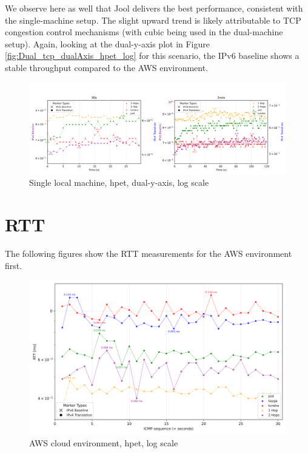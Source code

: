 We observe here as well that Jool delivers the best performance, consistent with the single-machine setup. 
The slight upward trend is likely attributable to TCP congestion control mechanisms (with cubic being used in the dual-machine setup).
Again, looking at the dual-y-axis plot in Figure \ref{fig:Dual_tcp_dualAxis_hpet_log} for this scenario, 
the IPv6 baseline shows a stable throughput compared to the AWS environment.
\begin{figure}[H]
    \centering
    \includegraphics[width=1\textwidth]{resources/plots/JitterPlot/Double_tcp_dualAxis_hpet_log.png}
    \caption{Single local machine, hpet, dual-y-axis, log scale}
    \label{fig:Local_tcp_dualAxis_hpet_log}
\end{figure}


\section{RTT}
The following figures show the RTT measurements for the AWS environment first.

\begin{figure}[H]
    \centering
    \includegraphics[width=1\textwidth]{resources/plots/CombinedPlot/RTT/AWS_ping_rtt_Ping_30s_log.png}
    \caption{AWS cloud environment, hpet, log scale}
    \label{fig:AWS_icmp_sameScale_hpet_log}

\end{figure}

